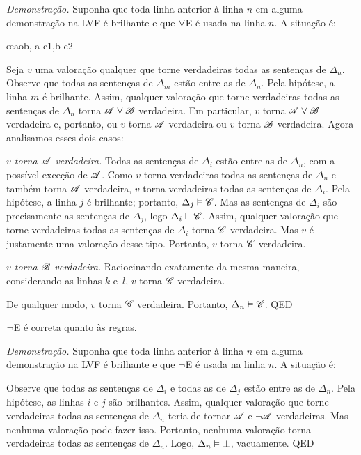 \emph{Demonstração.}
	Suponha que toda linha anterior à linha $n$ em alguma demonstração na LVF é brilhante e que $\vee$E é usada na linha $n$. A situação é:
   \begin{fitchproof}
	   \open
		   \AS %
	   \close
	   \open
		   \AS %
	   \close
	   \oe{aob, a-c1,b-c2}
   \end{fitchproof}\noindent
Seja $v$ uma valoração qualquer que torne verdadeiras todas as sentenças de $\Delta_n$. Observe que todas as sentenças de $\Delta_m$ estão entre as de $\Delta_n$. Pela hipótese, a linha $m$ é brilhante. Assim, qualquer valoração que torne verdadeiras todas as sentenças de $\Delta_n$ torna $\mathscr{A} \vee \mathscr{B}$ verdadeira. Em particular, $v$ torna $\mathscr{A} \vee \mathscr{B}$ verdadeira e, portanto, ou $v$ torna $\mathscr{A}$ verdadeira ou $v$ torna $\mathscr{B}$ verdadeira. Agora analisamos esses dois casos:
   \begin{numberlist}
	   \item \emph{$v$ torna $\mathscr{A}$ verdadeira.} Todas as sentenças de $\Delta_i$ estão entre as de $\Delta_n$, com a possível exceção de $\mathscr{A}$. Como $v$ torna verdadeiras todas as sentenças de $\Delta_n$ e também torna $\mathscr{A}$ verdadeira, $v$ torna verdadeiras todas as sentenças de $\Delta_i$. Pela hipótese, a linha $j$ é brilhante; portanto, $\Delta_j \vDash \mathscr{C}$. Mas as sentenças de $\Delta_i$ são precisamente as sentenças de $\Delta_j$, logo $\Delta_i \vDash \mathscr{C}$. Assim, qualquer valoração que torne verdadeiras todas as sentenças de $\Delta_i$ torna $\mathscr{C}$ verdadeira. Mas $v$ é justamente uma valoração desse tipo. Portanto, $v$ torna $\mathscr{C}$ verdadeira.
	   \item \emph{$v$ torna $\mathscr{B}$ verdadeira.} Raciocinando exatamente da mesma maneira, considerando as linhas $k$ e~$l$, $v$ torna $\mathscr{C}$ verdadeira.
	   \end{numberlist}
De qualquer modo, $v$ torna $\mathscr{C}$ verdadeira. Portanto, $\Delta_n \vDash \mathscr{C}$.
QED


\begin{factoidboxe}
	$\neg$E é correta quanto às regras.
\end{factoidboxe}

\emph{Demonstração.}
	Suponha que toda linha anterior à linha $n$ em alguma demonstração na LVF é brilhante e que $\neg$E é usada na linha $n$. A situação é:
\begin{fitchproof}
\end{fitchproof}\noindent
Observe que todas as sentenças de $\Delta_i$ e todas as de $\Delta_j$ estão entre as de $\Delta_n$. Pela hipótese, as linhas $i$ e $j$ são brilhantes. Assim, qualquer valoração que torne verdadeiras todas as sentenças de $\Delta_n$ teria de tornar $\mathscr{A}$ e $\neg\mathscr{A}$ verdadeiras. Mas nenhuma valoração pode fazer isso. Portanto, nenhuma valoração torna verdadeiras todas as sentenças de $\Delta_n$. Logo, $\Delta_n \vDash \bot$, vacuamente.
QED

